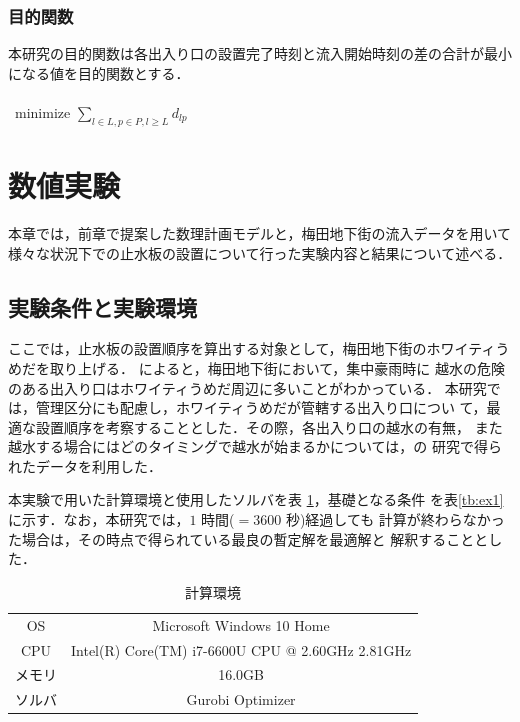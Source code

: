 \documentclass[a4paper,12pt,fleqn]{jarticle}
\begin{document}
\subsubsection{目的関数}
本研究の目的関数は各出入り口の設置完了時刻と流入開始時刻の差の合計が最小になる値を目的関数とする．\\
\\
\ minimize \quad $\displaystyle\sum_{l \in L,p \in P,l \geq L}d_{lp}$

  

  

\newpage
\section{数値実験}
\label{sec:num_ex}

本章では，前章で提案した数理計画モデルと，梅田地下街の流入データを用いて
様々な状況下での止水板の設置について行った実験内容と結果について述べる．

\subsection{実験条件と実験環境}

ここでは，止水板の設置順序を算出する対象として，梅田地下街のホワイティう
めだを取り上げる．\cite{岡部} によると，梅田地下街において，集中豪雨時に
越水の危険のある出入り口はホワイティうめだ周辺に多いことがわかっている．
%
本研究では，管理区分にも配慮し，ホワイティうめだが管轄する出入り口につい
て，最適な設置順序を考察することとした．その際，各出入り口の越水の有無，
また越水する場合にはどのタイミングで越水が始まるかについては，\cite{岡部}の
研究で得られたデータを利用した．

本実験で用いた計算環境と使用したソルバを表 \ref{計算環境}，基礎となる条件
を表\ref{tb:ex1}に示す．なお，本研究では，$1$ 時間($=3600$ 秒)経過しても
計算が終わらなかった場合は，その時点で得られている最良の暫定解を最適解と
解釈することとした．

\begin{table}[H]
  \begin{center}
    \caption{計算環境}
    \begin{tabular}{cc}\hline
      OS      & Microsoft Windows 10 Home \\
      CPU     & Intel(R) Core(TM) i7-6600U CPU @ 2.60GHz 2.81GHz \\
      メモリ  & 16.0GB \\
      ソルバ  & Gurobi Optimizer \\\hline
    \end{tabular}
    \label{計算環境}
  \end{center}
\end{table}
\end{document}
